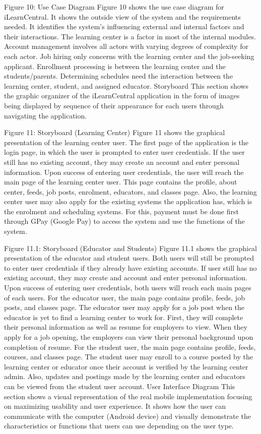 Figure 10: Use Case Diagram
Figure 10 shows the use case diagram for iLearnCentral. It shows the outside view of the system and the requirements needed. It identifies the system's influencing external and internal factors and their interactions.
The learning center is a factor in most of the internal modules. Account management involves all actors with varying degrees of complexity for each actor. Job hiring only concerns with the learning center and the job-seeking applicant. Enrollment processing is between the learning center and the students/parents. Determining schedules need the interaction between the learning center, student, and assigned educator. 
Storyboard
	This section shows the graphic organizer of the iLearnCentral application in the form of images being displayed by sequence of their appearance for each users through navigating the application. 
 
Figure 11: Storyboard (Learning Center)
	Figure 11 shows the graphical presentation of the learning center user. The first page of the application is the login page, in which the user is prompted to enter user credentials. If the user still has no existing account, they may create an account and enter personal information. Upon success of entering user credentials, the user will reach the main page of the learning center user. This page contains the profile, about center, feeds, job posts, enrolment, educators, and classes page.  
	Also, the learning center user may also apply for the existing systems the application has, which is the enrolment and scheduling systems. For this, payment must be done first through GPay (Google Pay) to access the system and use the functions of the system. 
      
Figure 11.1: Storyboard (Educator and Students)
	Figure 11.1 shows the graphical presentation of the educator and student users. Both users will still be prompted to enter user credentials if they already have existing accounts. If user still has no existing account, they may create and account and enter personal information. Upon success of entering user credentials, both users will reach each main pages of each users. 
	For the educator user, the main page contains profile, feeds, job posts, and classes page. The educator user may apply for a job post when the educator is yet to find a learning center to work for. First, they will complete their personal information as well as resume for employers to view. When they apply for a job opening, the employers can view their personal background upon completion of resume.
	For the student user, the main page contains profile, feeds, courses, and classes page. The student user may enroll to a course posted by the learning center or educator once their account is verified by the learning center admin. Also, updates and postings made by the learning center and educators can be viewed from the student user account. 
User Interface Diagram
	This section shows a visual representation of the real mobile implementation focusing on maximizing usability and user experience. It shows how the user can communicate with the computer (Android device) and visually demonstrate the characteristics or functions that users can use depending on the user type.
 
